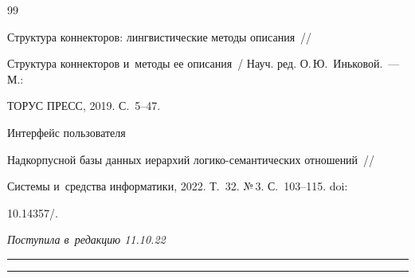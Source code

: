 {{\begin{thebibliography}{99}


 Структура коннекторов: лингвистические методы описания~/\!\!/ 


Структура коннекторов и~методы ее описания~/ Науч. ред. О.\,Ю.~Иньковой.~--- М.: 


ТОРУС ПРЕСС, 2019. С.~5--47.




 Интерфейс пользователя 


Надкорпусной базы данных иерархий ло\-ги\-ко-се\-ман\-ти\-че\-ских отношений~/\!\!/  


Сис\-те\-мы и~средства информатики, 2022. Т.~32. №\,3. С.~103--115. doi: 


10.14357\!/.


 \end{thebibliography}


} }











\vspace*{-6pt}





\hfill{\small\textit{Поступила в~редакцию 11.10.22}}





\vspace*{8pt}





\hrule





\vspace*{2pt}















\hrule





\vspace*{8pt}





